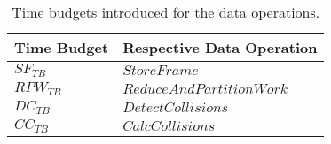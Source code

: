 \begin{table}
\centering
\small
\begin{tabular}{|ll|}
\hline
  \textbf{Time Budget} & \textbf{Respective Data Operation}
  \\
\hline
\hline
  $SF_{TB}$ & $StoreFrame$
  \\
\hline
  $RPW_{TB}$ & $ReduceAndPartitionWork$
  \\
\hline
  $DC_{TB}$ & $DetectCollisions$
  \\
\hline
  $CC_{TB}$ & $CalcCollisions$
  \\
\hline
\end{tabular}
\caption{Time budgets introduced for the data operations.}
\label{tab:TimeBudgets}
\end{table}
